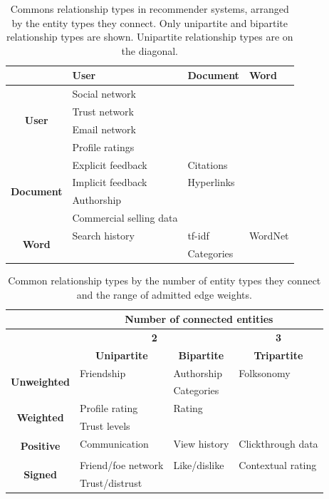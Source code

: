 \documentclass{article}
\begin{document}
\begin{table}
  \centering
  \small
  \caption{
    Commons relationship types in recommender systems, arranged by the
    entity types they connect.   Only unipartite and bipartite
    relationship types are shown.   Unipartite relationship types are on
    the diagonal. 
  }
  \begin{tabular}{|c||l|l|l|}
    \hline
    & \textbf{User} & \textbf{Document} & \textbf{Word} \\
    \hline
    \hline
    \multirow{4}{*}{\textbf{User}} & Social network & 
    &   \\ & Trust network &  &  \\ & Email network
    &  & \\  & Profile ratings &   &  \\
    \hline
    \multirow{4}{*}{\textbf{Document}} & Explicit feedback & Citations &
     \\ & Implicit feedback & Hyperlinks &  \\ &
    Authorship & &  \\ & Commercial selling data  & &  \\
    \hline
    \multirow{2}{*}{\textbf{Word}} & Search history & tf-idf & WordNet \\
    & & Categories &  \\
    \hline
  \end{tabular}
  \label{tab:reltypes}
\end{table}

\begin{table}
  \centering
  \small
  \caption{
    Common relationship types by the number of entity types they connect
    and the range of admitted edge weights. 
  }
  \begin{tabular}{|c||l|l|l|}
    \hline
     & \multicolumn{3}{|c|}{\textbf{Number of connected entities}} \\
    \hline
     & \multicolumn{2}{|c|}{\textbf 2} & \multicolumn{1}{|c|}{\textbf 3} \\
    \hline
     & \multicolumn{1}{|c|}{\textbf{Unipartite}} &
    \multicolumn{1}{|c|}{\textbf{Bipartite}} & \multicolumn{1}{|c|}{\textbf{Tripartite}}
    \\
    \hline
    \hline
    \multirow{2}{*}{\textbf{Unweighted}} &
    Friendship & Authorship & Folksonomy \\
    & & Categories & \\
    \hline
    \multirow{2}{*}{\textbf{Weighted}} & Profile rating & Rating & \\
    & Trust levels & & \\
    \hline
    \multirow{2}{*}{\textbf{Positive}} & Communication & View history & Clickthrough data \\
    & & & \\
    \hline
    \multirow{2}{*}{\textbf{Signed}} & Friend/foe network &
    Like/dislike & Contextual rating \\ 
    & Trust/distrust & &  \\
    \hline 
  \end{tabular}
  \label{tab:format-weight}
\end{table}
\end{document}
